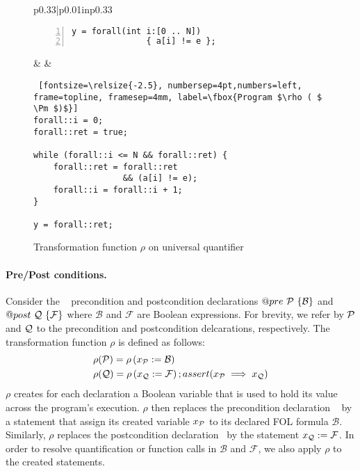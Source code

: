 \begin{figure}[bt]
\centering
\begin{tabular}{p{}|p{0.01in}p{}}
\begin{Verbatim}[fontsize=\relsize{-2.5}, numbersep=4pt,numbers=left,
frame=topline, framesep=4mm, label=\fbox{Program \Pm}]
y = forall(int i:[0 .. N]) 
               { a[i] != e };
\end{Verbatim}
& &
\begin{Verbatim} [fontsize=\relsize{-2.5}, numbersep=4pt,numbers=left,
frame=topline, framesep=4mm, label=\fbox{Program $\rho ( $ \Pm $)$}]
forall::i = 0;
forall::ret = true;

while (forall::i <= N && forall::ret) {
    forall::ret = forall::ret 
                  && (a[i] != e);
    forall::i = forall::i + 1;
}

y = forall::ret;
\end{Verbatim}
\end{tabular}
\caption{Transformation function $\rho$ on universal quantifier}
\label{fig:trans:forall}
\end{figure}
%
\paragraph{Pre/Post conditions.} 
Consider the \psqlanguage~
precondition and postcondition declarations $@pre~ \mathcal{P} ~\{ \mathcal{B} \}$
and $@post ~\mathcal{Q} ~\{ \mathcal{F} \}$ where $\mathcal{B}$ and $\mathcal{F}$ are 
Boolean expressions. For brevity, we refer by $\mathcal{P}$ and $\mathcal{Q}$ to the precondition
and postcondition delcarations, respectively.  
The transformation function $\rho$ is defined as follows:
\begin{eqnarray}
& \rho(\mathcal{P}) = \rho \left( x_{\mathcal{P}} := \mathcal{B} \right) \\
& \rho(\mathcal{Q}) = \rho \left( x_{\mathcal{Q}} := \mathcal{F} \right) ; assert(x_{\mathcal{P}} \implies x_{\mathcal{Q}})
\end{eqnarray}
$\rho$ creates for each declaration a Boolean variable that is used to hold its value
across the program's execution. $\rho$ then replaces the precondition declaration \Pre~
by a statement that assign its created variable $x_{\mathcal{P}}$ to its declared FOL 
formula $\mathcal{B}$. Similarly, $\rho$ replaces the postcondition declaration 
\Post~by the statement $x_{\mathcal{Q}} := \mathcal{F}$. In order to resolve quantification
or function calls in $\mathcal{B}$ and $\mathcal{F}$, we also apply $\rho$ to the created
statements. 


